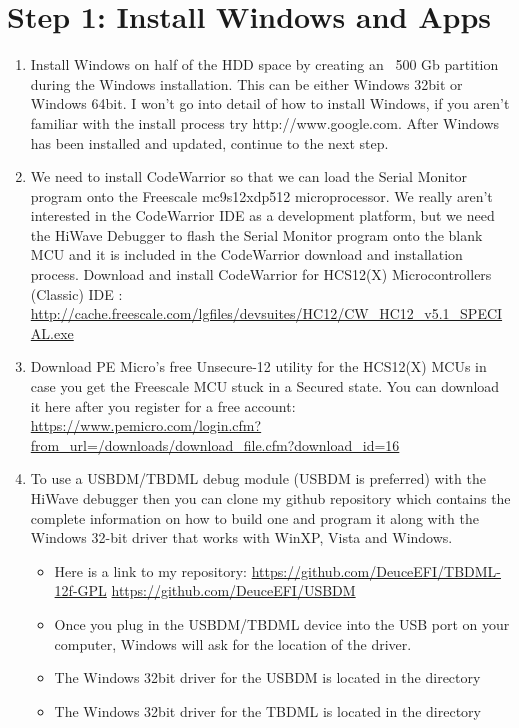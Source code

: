 \documentclass[12pt,notitlepage,onecolumn,oneside,openany]{memoir}
\begin{document}
\chapter{\textsf{Step 1:  Install Windows and Apps}}
\begin{enumerate}
\item \textsf{Install Windows on half of the HDD space by creating an ~500 Gb partition during the Windows installation.}
\textsf{This can be either Windows 32bit or Windows 64bit.  I won't go into detail of how to install Windows, if you aren't familiar with the install process try http://www.google.com.  After Windows has been installed and updated, continue to the next step.}

\item \textsf{We need to install CodeWarrior so that we can load the Serial Monitor program onto the Freescale mc9s12xdp512 microprocessor.  We really aren't interested in the CodeWarrior IDE as a development platform, but we need the HiWave Debugger to flash the Serial Monitor program onto the blank MCU and it is included in the CodeWarrior download and installation process.}\newline
      \textsf{Download and install CodeWarrior for HCS12(X) Microcontrollers (Classic) IDE :} \newline
      \url{http://cache.freescale.com/lgfiles/devsuites/HC12/CW_HC12_v5.1_SPECIAL.exe}

\item \textsf{Download PE Micro's free Unsecure-12 utility for the HCS12(X) MCUs in case you get the Freescale MCU stuck in a Secured state. You can download it here after you register for a free account:} \newline
\url{https://www.pemicro.com/login.cfm?from_url=/downloads/download_file.cfm?download_id=16}

\item \textsf{To use a USBDM/TBDML debug module (USBDM is preferred) with the HiWave debugger then you can clone my github repository which contains the complete information on how to build one and program it along with the Windows 32-bit driver that works with WinXP, Vista and Windows.} 
\begin{itemize}
      \item \textsf{Here is a link to my repository:} \newline
            \url{https://github.com/DeuceEFI/TBDML-12f-GPL}
            \url{https://github.com/DeuceEFI/USBDM}
      \item \textsf{Once you plug in the USBDM/TBDML device into the USB port on your computer, Windows will ask for the location of the driver.} 
      \item \textsf{The Windows 32bit driver for the USBDM is located in the  directory} 
      \item \textsf{The Windows 32bit driver for the TBDML is located in the  directory} 
       

\end{itemize}
\end{enumerate}
\end{document}
